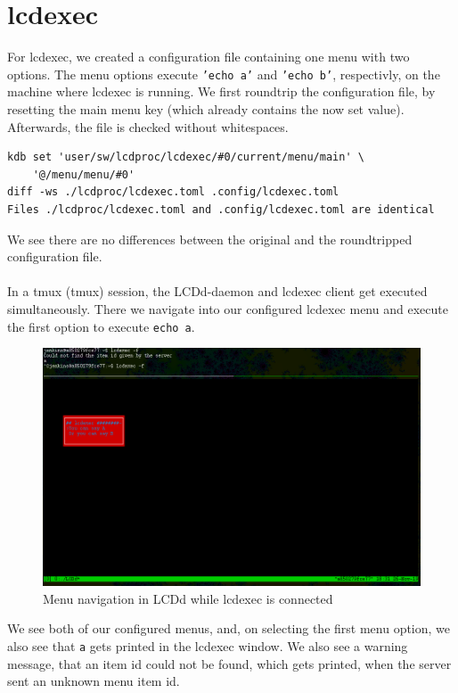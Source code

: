 \documentclass[12pt]{report}
\begin{document}
\section{lcdexec}
For lcdexec, we created a configuration file containing one menu with two options.
The menu options execute \texttt{'echo a'} and \texttt{'echo b'}, respectivly, on the machine where lcdexec is running.
We first roundtrip the configuration file, by resetting the main menu key (which already contains the now set value).
Afterwards, the file is checked without whitespaces.
{\small
\begin{verbatim}
kdb set 'user/sw/lcdproc/lcdexec/#0/current/menu/main' \
	'@/menu/menu/#0'
diff -ws ./lcdproc/lcdexec.toml .config/lcdexec.toml 
Files ./lcdproc/lcdexec.toml and .config/lcdexec.toml are identical
\end{verbatim}
}
We see there are no differences between the original and the roundtripped configuration file.
\\\\
In a \acrshort{tmux} (\acrlong{tmux}) session, the LCDd-daemon and lcdexec client get executed simultaneously.
There we navigate into our configured lcdexec menu and execute the first option to execute \texttt{echo a}.
\FloatBarrier
\begin{figure}[h!]
	\centering
		\includegraphics[width=\linewidth]{lcdexec_menu.png}
  \caption{Menu navigation in LCDd while lcdexec is connected}
\label{fig:lcdexec}
\end{figure}
\FloatBarrier
We see both of our configured menus, and, on selecting the first menu option, we also see that \texttt{a} gets printed in the lcdexec window.
We also see a warning message, that an item id could not be found, which gets printed, when the server sent an unknown menu item id.
\end{document}
